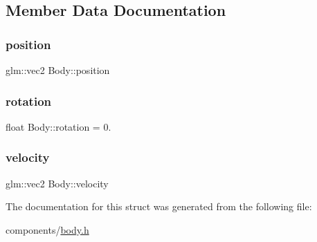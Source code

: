 \subsection{Member Data Documentation}
\mbox{\label{structBody_aa209ca47cc5d2914c1b8e5d1a02f502d}} 
\subsubsection{\texorpdfstring{position}{position}}
{\footnotesize\ttfamily glm\+::vec2 Body\+::position}

\mbox{\label{structBody_a390b12d4160243ae0f38aee3a34b417b}} 
\subsubsection{\texorpdfstring{rotation}{rotation}}
{\footnotesize\ttfamily float Body\+::rotation = 0.}

\mbox{\label{structBody_a9f3812969ac9d1438054854f8ff90600}} 
\subsubsection{\texorpdfstring{velocity}{velocity}}
{\footnotesize\ttfamily glm\+::vec2 Body\+::velocity}



The documentation for this struct was generated from the following file\+:\begin{DoxyCompactItemize}
\item 
components/\hyperlink{body_8h}{body.\+h}\end{DoxyCompactItemize}
